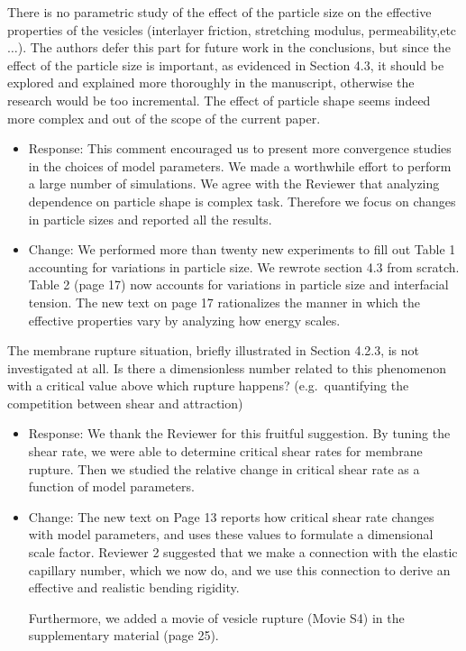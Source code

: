 \documentclass[11pt]{article}
\newcommand{\comment}[1]{{\color{blue} #1}}
\begin{document}
\noindent
\comment{There is no parametric study of the effect of the particle size
on the effective properties of the vesicles (interlayer friction,
stretching modulus, permeability,etc$\ldots$). The authors defer this
part for future work in the conclusions, but since the effect of the
particle size is important, as evidenced in Section 4.3, it should be
explored and explained more thoroughly in the manuscript, otherwise the
research would be too incremental. The effect of particle shape seems
indeed more complex and out of the scope of the current paper.}
\begin{itemize}
\item Response: This comment encouraged us to present more convergence
  studies in the choices of model parameters. We made a worthwhile
  effort to perform a large number of simulations. We agree with the
  Reviewer that analyzing dependence on particle shape is complex task.
  Therefore we focus on changes in particle sizes and reported all the results.
\item Change: We performed more than twenty new experiments to fill out Table 1
  accounting for variations in particle size.  
  We rewrote section 4.3 from scratch. 
  Table 2 (page 17) now accounts for variations in particle size
  and interfacial tension. The new text on page 17 rationalizes
  the manner in which the effective properties vary by analyzing
  how energy scales. 
\end{itemize}

\noindent
\comment{The membrane rupture situation, briefly illustrated in Section
4.2.3, is not investigated at all. Is there a dimensionless number
related to this phenomenon with a critical value above which rupture
happens? (e.g.~quantifying the competition between shear and
attraction)}

\begin{itemize}
\item Response: We thank the Reviewer for this fruitful suggestion.
  By tuning the shear rate, we were able to determine critical
  shear rates for membrane rupture.  Then we studied the relative
  change in critical shear rate as a function of model parameters.

\item Change:
  The new text on Page 13 reports how critical shear rate changes
  with model parameters, and uses these values to formulate
  a dimensional scale factor.  Reviewer 2 suggested that we make
  a connection with the elastic capillary number, which we now do,
  and we use this connection to derive an effective and realistic
  bending rigidity.

  Furthermore, we added a movie of vesicle rupture (Movie S4) in the supplementary material (page 25).
\end{itemize}
\end{document}
